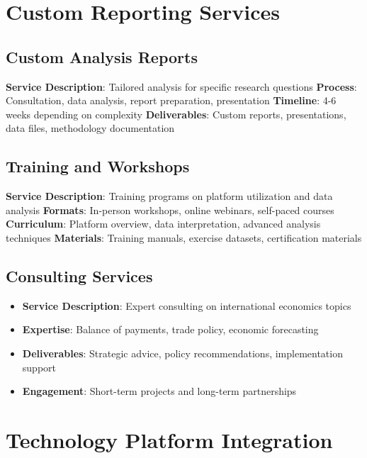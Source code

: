 \documentclass[11pt,a4paper]{article}
\begin{document}
\section{Custom Reporting Services}

\subsection{Custom Analysis Reports}
\begin{itemize}
    \textbf{Service Description}: Tailored analysis for specific research questions
    \textbf{Process}: Consultation, data analysis, report preparation, presentation
    \textbf{Timeline}: 4-6 weeks depending on complexity
    \textbf{Deliverables}: Custom reports, presentations, data files, methodology documentation
\end{itemize}

\subsection{Training and Workshops}
\begin{itemize}
    \textbf{Service Description}: Training programs on platform utilization and data analysis
    \textbf{Formats}: In-person workshops, online webinars, self-paced courses
    \textbf{Curriculum}: Platform overview, data interpretation, advanced analysis techniques
    \textbf{Materials}: Training manuals, exercise datasets, certification materials
\end{itemize}

\subsection{Consulting Services}
\begin{itemize}
    \item \textbf{Service Description}: Expert consulting on international economics topics
    \item \textbf{Expertise}: Balance of payments, trade policy, economic forecasting
    \item \textbf{Deliverables}: Strategic advice, policy recommendations, implementation support
    \item \textbf{Engagement}: Short-term projects and long-term partnerships
\end{itemize}

\section{Technology Platform Integration}
\end{document}
